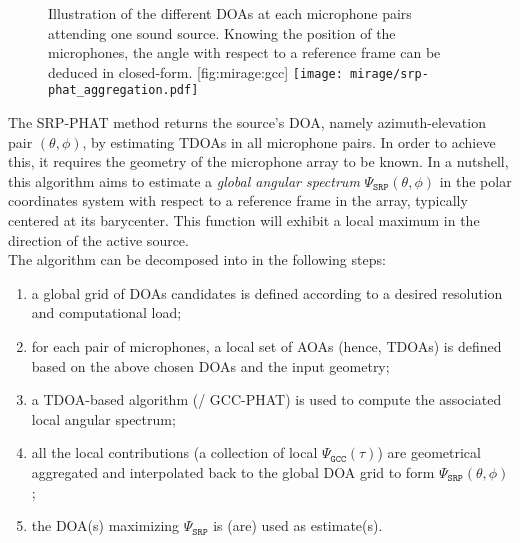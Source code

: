 \begin{figure}
    \begin{sidecaption}[t]{
        Illustration of the different \acp{DOA} at each microphone pairs attending one sound source.
        Knowing the position of the microphones, the angle with respect to a reference frame can be deduced in closed-form.
    }[fig:mirage:gcc]
    \texttt{[image: mirage/srp-phat\_aggregation.pdf]}
\end{sidecaption}
\end{figure}

\mynewline
The \ac{SRP-PHAT} method returns the source's \ac{DOA}, namely azimuth-elevation pair $(\theta, \phi)$, by estimating \acp{TDOA} in all microphone pairs.
In order to achieve this, it requires the geometry of the microphone array to be known.
In a nutshell, this algorithm aims to estimate a \textit{global angular spectrum} $\Psi_{\mathtt{SRP}}(\theta,\phi)$ in the polar coordinates system with respect to a reference frame in the array, typically centered at its barycenter.
This function will exhibit a local maximum in the direction of the active source.
\\The algorithm can be decomposed into in the following steps:
\begin{enumerate}
    \item a global grid of \acp{DOA} candidates is defined according to a desired resolution and computational load;
    \item for each pair of microphones, a local set of \acp{AOA} (hence, \acp{TDOA}) is defined based on the above chosen \acp{DOA} and the input geometry;
    \item a TDOA-based algorithm (\eg/ \ac{GCC-PHAT}) is used to compute the associated local angular spectrum;
    \item all the local contributions (a collection of local $\Psi_\mathtt{GCC}(\tau)$) are geometrical aggregated and interpolated back to the global \ac{DOA} grid to form $\Psi_{\mathtt{SRP}}(\theta,\phi)$;
    \item the \acs{DOA}(s) maximizing $\Psi_\mathtt{SRP}$ is (are) used as estimate(s).
\end{enumerate}

